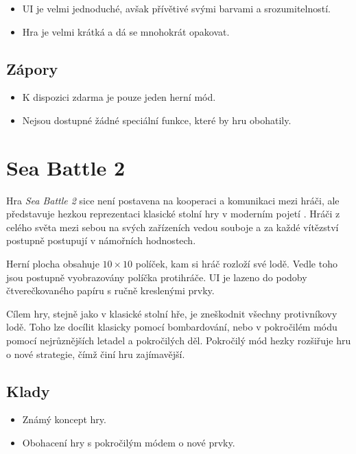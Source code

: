 \begin{itemize}
    \item UI je velmi jednoduché, avšak přívětivé svými barvami a srozumitelností.
    \item Hra je velmi krátká a dá se mnohokrát opakovat.
\end{itemize}

\subsection*{Zápory}

\begin{itemize}
    \item K dispozici zdarma je pouze jeden herní mód.
    \item Nejsou dostupné žádné speciální funkce, které by hru obohatily.
\end{itemize}

\section{Sea Battle 2}

Hra \emph{Sea Battle 2} sice není postavena na kooperaci a komunikaci mezi
hráči,
ale představuje hezkou reprezentaci klasické stolní hry v moderním pojetí
\cite{byril_sea}.
Hráči z celého světa mezi sebou na svých zařízeních vedou souboje
a za každé vítězství postupně postupují v námořních hodnostech.

Herní plocha obsahuje $10 \times 10$ políček,
kam si hráč rozloží své lodě.
Vedle toho jsou postupně vyobrazovány políčka protihráče.
UI je lazeno do podoby čtverečkovaného papíru s ručně kreslenými prvky.

Cílem hry, stejně jako v klasické stolní hře,
je zneškodnit všechny protivníkovy lodě.
Toho lze docílit klasicky pomocí bombardování,
nebo v pokročilém módu pomocí nejrůznějších letadel a pokročilých děl.
Pokročilý mód hezky rozšiřuje hru o nové strategie,
čímž činí hru zajímavější.

\FloatBarrier

\subsection*{Klady}

\begin{itemize}
    \item Známý koncept hry.
    \item Obohacení hry s pokročilým módem o nové prvky.
\end{itemize}

